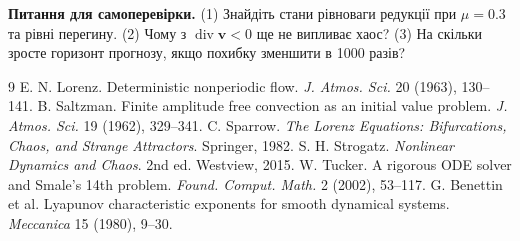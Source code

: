\documentclass[11pt,a4paper]{article}
\begin{document}
\textbf{Питання для самоперевірки.} (1) Знайдіть стани рівноваги редукції при $\mu=0.3$ та рівні
перегину. (2) Чому з $\operatorname{div}\mathbf v<0$ ще не випливає хаос? (3) На скільки зросте
горизонт прогнозу, якщо похибку зменшити в 1000 разів?

\begin{thebibliography}{9}\small
{} E. N. Lorenz. Deterministic nonperiodic flow. \textit{J. Atmos. Sci.} 20 (1963), 130–141.
 B. Saltzman. Finite amplitude free convection as an initial value problem. \textit{J. Atmos. Sci.} 19 (1962), 329–341.
 C. Sparrow. \textit{The Lorenz Equations: Bifurcations, Chaos, and Strange Attractors}. Springer, 1982.
 S. H. Strogatz. \textit{Nonlinear Dynamics and Chaos}. 2nd ed. Westview, 2015.
 W. Tucker. A rigorous ODE solver and Smale's 14th problem. \textit{Found. Comput. Math.} 2 (2002), 53–117.
 G. Benettin et al. Lyapunov characteristic exponents for smooth dynamical systems. \textit{Meccanica} 15 (1980), 9–30.
\end{thebibliography}
\end{document}
